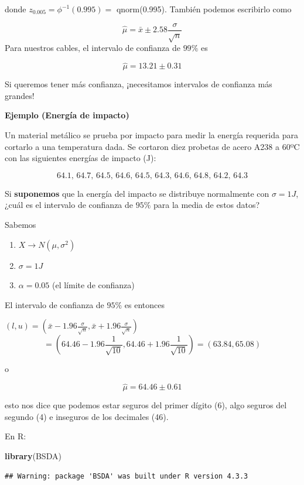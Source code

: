 \documentclass[
]{book}
\newenvironment{Shaded}{\begin{snugshade}}{\end{snugshade}}
\newcommand{\FunctionTok}[1]{\textcolor[rgb]{0.13,0.29,0.53}{\textbf{#1}}}
\newcommand{\NormalTok}[1]{#1}
\providecommand{\tightlist}{%
  \setlength{\itemsep}{0pt}\setlength{\parskip}{0pt}}
\begin{document}
donde \(z_{0.005}=\phi^{-1}(0.995)=\) qnorm(0.995). También podemos escribirlo como

\[\hat{\mu}=\bar{x} \pm 2.58\frac{\sigma}{\sqrt{n}}\]
Para nuestros cables, el intervalo de confianza de \(99\%\) es

\[\hat{\mu}= 13.21 \pm 0.31\]

Si queremos tener más confianza, ¡necesitamos intervalos de confianza más grandes!

\textbf{Ejemplo (Energía de impacto)}

Un material metálico se prueba por impacto para medir la energía requerida para cortarlo a una temperatura dada. Se cortaron diez probetas de acero A238 a 60ºC con las siguientes energías de impacto (J):

\[64.1,\, 64.7,\, 64.5,\, 64.6,\, 64.5,\, 64.3,\, 64.6,\, 64.8,\, 64.2,\, 64.3\]

Si \textbf{suponemos} que la energía del impacto se distribuye normalmente con \(\sigma=1J\), ¿cuál es el intervalo de confianza de \(95\%\) para la media de estos datos?

Sabemos

\begin{enumerate}
\def\labelenumi{\arabic{enumi}.}
\tightlist
\item
  \(X \rightarrow N(\mu, \sigma^2)\)
\item
  \(\sigma=1J\)
\item
  \(\alpha=0.05\) (el límite de confianza)
\end{enumerate}

El intervalo de confianza de \(95\%\) es entonces

\((l,u)=(\bar{x}-1.96 \frac{\sigma}{\sqrt{n}}, \bar{x}+1.96 \frac{\sigma}{\sqrt{n}})\)
\[=(64.46-1.96 \frac{1}{\sqrt{10}}, 64.46+1.96 \frac{1}{\sqrt{10}})=(63.84,65.08)\]

o

\[\hat{\mu}=64.46 \pm 0.61\]

esto nos dice que podemos estar seguros del primer dígito (6), algo seguros del segundo (4) e inseguros de los decimales (46).

En R:

\begin{Shaded}
\begin{Highlighting}[]
\FunctionTok{library}\NormalTok{(BSDA) }
\end{Highlighting}
\end{Shaded}

\begin{verbatim}
## Warning: package 'BSDA' was built under R version 4.3.3
\end{verbatim}
\end{document}
